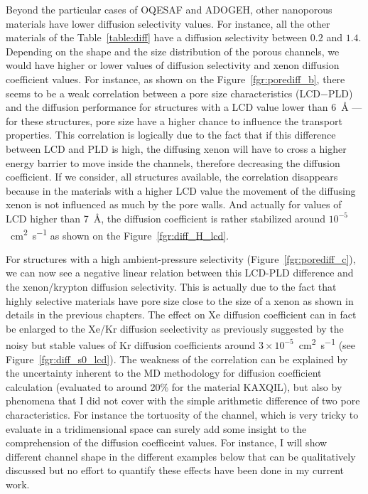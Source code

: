 \documentclass[main]{subfiles}
\begin{document}
Beyond the particular cases of OQESAF and ADOGEH, other nanoporous materials have lower diffusion selectivity values. For instance, all the other materials of the Table~\ref{table:diff} have a diffusion selectivity between $0.2$ and $1.4$. Depending on the shape and the size distribution of the porous channels, we would have higher or lower values of diffusion selectivity and xenon diffusion coefficient values. For instance, as shown on the Figure~\ref{fgr:porediff_b}, there seems to be a weak correlation between a pore size characteristics (LCD$-$PLD) and the diffusion performance for structures with a LCD value lower than \SI{6}{\angstrom} --- for these structures, pore size have a higher chance to influence the transport properties. This correlation is logically due to the fact that if this difference between LCD and PLD is high, the diffusing xenon will have to cross a higher energy barrier to move inside the channels, therefore decreasing the diffusion coefficient. If we consider, all structures available, the correlation disappears because in the materials with a higher LCD value the movement of the diffusing xenon is not influenced as much by the pore walls. And actually for values of LCD higher than \SI{7}{\angstrom}, the diffusion coefficient is rather stabilized around $10^{-5}$~\si{\square\cm\per\s} as shown on the Figure~\ref{fgr:diff_H_lcd}. 

For structures with a high ambient-pressure selectivity (Figure~\ref{fgr:porediff_c}), we can now see a negative linear relation between this LCD-PLD difference and the xenon/krypton diffusion selectivity. This is actually due to the fact that highly selective materials have pore size close to the size of a xenon as shown in details in the previous chapters. The effect on Xe diffusion coefficient can in fact be enlarged to the Xe/Kr diffusion seelectivity as previously suggested by the noisy but stable values of Kr diffusion coefficients around $3\times10^{-5}$~\si{\square\cm\per\s} (see Figure~\ref{fgr:diff_s0_lcd}). The weakness of the correlation can be explained by the uncertainty inherent to the MD methodology for diffusion coefficient calculation (evaluated to around {20\%} for the material KAXQIL), but also by phenomena that I did not cover with the simple arithmetic difference of two pore characteristics. For instance the tortuosity of the channel, which is very tricky to evaluate in a tridimensional space can surely add some insight to the comprehension of the diffusion coefficeint values. For instance, I will show different channel shape in the different examples below that can be qualitatively discussed but no effort to quantify these effects have been done in my current work.
\end{document}
